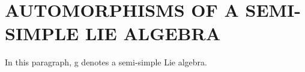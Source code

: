 \section{AUTOMORPHISMS OF A SEMI-SIMPLE LIE ALGEBRA}

In this paragraph, g denotes a semi-simple Lie algebra.

